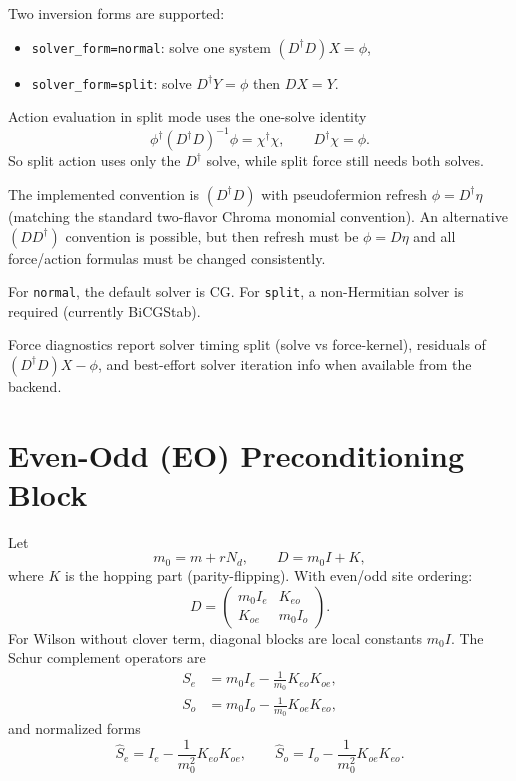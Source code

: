\documentclass[11pt]{article}
\begin{document}
Two inversion forms are supported:
\begin{itemize}
  \item \texttt{solver\_form=normal}: solve one system $(D^\dagger D)X=\phi$,
  \item \texttt{solver\_form=split}: solve $D^\dagger Y=\phi$ then $D X=Y$.
\end{itemize}
Action evaluation in split mode uses the one-solve identity
\begin{equation}
\phi^\dagger (D^\dagger D)^{-1}\phi = \chi^\dagger\chi,\qquad D^\dagger\chi=\phi.
\end{equation}
So split action uses only the $D^\dagger$ solve, while split force still needs both solves.

The implemented convention is $(D^\dagger D)$ with pseudofermion refresh
$\phi=D^\dagger\eta$ (matching the standard two-flavor Chroma monomial convention).
An alternative $(DD^\dagger)$ convention is possible, but then refresh must be
$\phi=D\eta$ and all force/action formulas must be changed consistently.

For \texttt{normal}, the default solver is CG.
For \texttt{split}, a non-Hermitian solver is required (currently BiCGStab).

Force diagnostics report solver timing split (solve vs force-kernel), residuals of
$(D^\dagger D)X-\phi$, and best-effort solver iteration info when available from the backend.

\section{Even-Odd (EO) Preconditioning Block}
Let
\begin{equation}
m_0 = m + r N_d,\qquad D = m_0 I + K,
\end{equation}
where $K$ is the hopping part (parity-flipping). With even/odd site ordering:
\begin{equation}
D =
\begin{pmatrix}
m_0 I_e & K_{eo}\\
K_{oe}  & m_0 I_o
\end{pmatrix}.
\end{equation}
For Wilson without clover term, diagonal blocks are local constants $m_0 I$.
The Schur complement operators are
\begin{align}
S_e &= m_0 I_e - \frac{1}{m_0} K_{eo}K_{oe},\\
S_o &= m_0 I_o - \frac{1}{m_0} K_{oe}K_{eo},
\end{align}
and normalized forms
\begin{equation}
\hat S_e = I_e - \frac{1}{m_0^2}K_{eo}K_{oe},\qquad
\hat S_o = I_o - \frac{1}{m_0^2}K_{oe}K_{eo}.
\end{equation}
\end{document}
